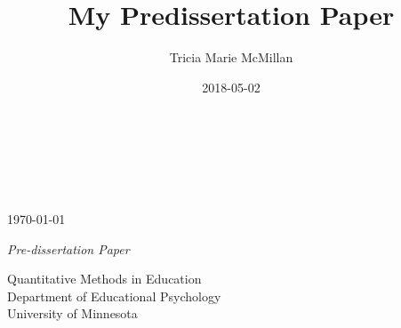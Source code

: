 \documentclass[12pt,letterpaper,oneside,oldfontcommands]{memoir}
\title{My Predissertation Paper}
\author{Tricia Marie McMillan}
\date{2018-05-02}
\theoremstyle{definition}
\theoremstyle{definition}
\theoremstyle{definition}
\theoremstyle{remark}
\begin{document}
\maketitle

\pagestyle{empty}




\begin{center}
{\Huge \textcolor{smartblue}{{\textsc{\MakeTextUppercase{{\thetitle}}}}}\\}


\vskip 1in
{\LARGE {}}\\
\vskip 0.75in
\theauthor \\
\monthyeardate\today

\vskip 0.75in
\textit{Pre-dissertation Paper} \\

\vskip 0.75in

Quantitative Methods in Education \\[2ex]
Department of Educational Psychology \\[-1.5ex]
University of Minnesota

\vfill

\end{center}

\makeatletter




\clearpage

\begin{abstract}

\begingroup
\obeylines
%
\endgroup%

\end{abstract}



\end{document}
